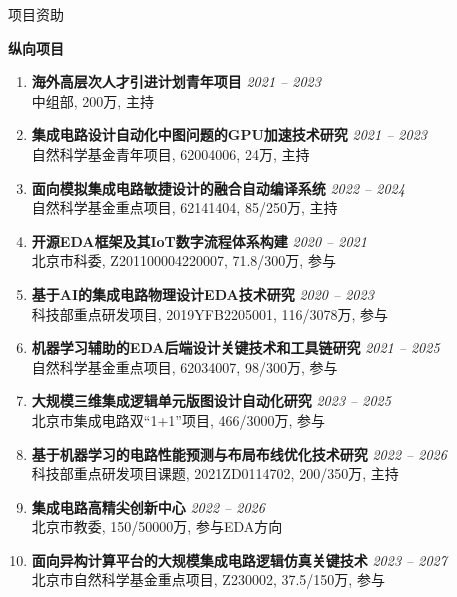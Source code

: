 
\begin{rSection}{项目资助}


\textbf{纵向项目}
        
\begin{enumerate}[font=\normalfont]

\item
{\bf 海外高层次人才引进计划青年项目 } \hfill{\em 2021 -- 2023} \\
中组部, 200万, 主持

\item 
{\bf 集成电路设计自动化中图问题的GPU加速技术研究 } \hfill{\em 2021 -- 2023} \\
自然科学基金青年项目, 62004006, 24万, 主持

\item 
{\bf 面向模拟集成电路敏捷设计的融合自动编译系统 } \hfill{\em 2022 -- 2024} \\
自然科学基金重点项目, 62141404, 85/250万, 主持

\item 
{\bf 开源EDA框架及其IoT数字流程体系构建 } \hfill{\em 2020 -- 2021} \\
北京市科委, Z201100004220007, 71.8/300万, 参与

\item 
{\bf 基于AI的集成电路物理设计EDA技术研究 } \hfill{\em 2020 -- 2023} \\
科技部重点研发项目, 2019YFB2205001, 116/3078万, 参与

\item 
{\bf 机器学习辅助的EDA后端设计关键技术和工具链研究 } \hfill{\em 2021 -- 2025} \\
自然科学基金重点项目, 62034007, 98/300万, 参与

\item 
{\bf 大规模三维集成逻辑单元版图设计自动化研究 } \hfill{\em 2023 -- 2025} \\
北京市集成电路双``1+1''项目, 466/3000万, 参与

\item 
{\bf 基于机器学习的电路性能预测与布局布线优化技术研究 } \hfill{\em 2022 -- 2026} \\
科技部重点研发项目课题, 2021ZD0114702, 200/350万, 主持

\item 
{\bf 集成电路高精尖创新中心 } \hfill{\em 2022 -- 2026} \\
北京市教委, 150/50000万, 参与EDA方向

\item 
{\bf 面向异构计算平台的大规模集成电路逻辑仿真关键技术 } \hfill{\em 2023 -- 2027} \\
北京市自然科学基金重点项目, Z230002, 37.5/150万, 参与


\end{enumerate}
\end{rSection}
